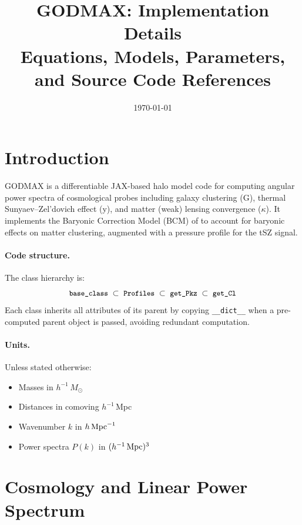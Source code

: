 \documentclass[12pt,a4paper]{article}
\title{\textbf{GODMAX: Implementation Details}\\
\large Equations, Models, Parameters, and Source Code References}
\author{}
\date{\today}
\newcommand{\code}[1]{\texttt{\small #1}}
\begin{document}
\maketitle
\tableofcontents
\newpage

\section{Introduction}

GODMAX is a differentiable JAX-based halo model code for computing angular power
spectra of cosmological probes including galaxy clustering (G), thermal
Sunyaev--Zel'dovich effect (y), and matter (weak) lensing convergence ($\kappa$). It
implements the Baryonic Correction Model (BCM) of
\cite{Schneider2015,Schneider2019} to account for baryonic effects on
matter clustering, augmented with a pressure profile for the tSZ signal.

\paragraph{Code structure.}
The class hierarchy is:
\[
  \code{base\_class} \;\subset\; \code{Profiles} \;\subset\; \code{get\_Pkz}
  \;\subset\; \code{get\_Cl}
\]
Each class inherits all attributes of its parent by copying \code{\_\_dict\_\_}
when a pre-computed parent object is passed, avoiding redundant computation.

\paragraph{Units.}
Unless stated otherwise:
\begin{itemize}
  \item Masses in $h^{-1}\,M_\odot$
  \item Distances in comoving $h^{-1}$\,Mpc
  \item Wavenumber $k$ in $h\,{\rm Mpc}^{-1}$
  \item Power spectra $P(k)$ in $(h^{-1}\,{\rm Mpc})^3$
\end{itemize}

\section{Cosmology and Linear Power Spectrum}
\label{sec:cosmo}
\end{document}
